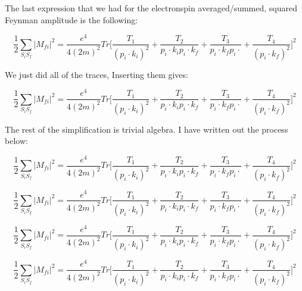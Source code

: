 \documentclass[a4]{article}
\begin{document}
    The last expression that we had for the electronspin averaged/summed, squared Feynman amplitude is the following:

    \begin{equation}
        \frac{1}{2} \sum_{S_i S_f} |M_{fi}|^2 = \frac{e^4}{4 (2m)^2} Tr \Bigg[ \frac{T_1}{(p_i \cdot k_i)^2} + \frac{T_2}{p_i \cdot k_i p_i \cdot k_f} + \frac{T_3}{p_i \cdot k_f p_i \cdot} + \frac{T_4}{(p_i \cdot k_f)^2} \Bigg]^2
    \end{equation}
    
    We just did all of the traces, Inserting them gives:

    \begin{equation}
        \frac{1}{2} \sum_{S_i S_f} |M_{fi}|^2 = \frac{e^4}{4 (2m)^2} Tr \Bigg[ \frac{T_1}{(p_i \cdot k_i)^2} + \frac{T_2}{p_i \cdot k_i p_i \cdot k_f} + \frac{T_3}{p_i \cdot k_f p_i \cdot} + \frac{T_4}{(p_i \cdot k_f)^2} \Bigg]^2
    \end{equation}

    The rest of the simplification is trivial algebra. I have written out the process below:

    \begin{equation}
        \frac{1}{2} \sum_{S_i S_f} |M_{fi}|^2 = \frac{e^4}{4 (2m)^2} Tr \Bigg[ \frac{T_1}{(p_i \cdot k_i)^2} + \frac{T_2}{p_i \cdot k_i p_i \cdot k_f} + \frac{T_3}{p_i \cdot k_f p_i \cdot} + \frac{T_4}{(p_i \cdot k_f)^2} \Bigg]^2
    \end{equation}

    \begin{equation}
        \frac{1}{2} \sum_{S_i S_f} |M_{fi}|^2 = \frac{e^4}{4 (2m)^2} Tr \Bigg[ \frac{T_1}{(p_i \cdot k_i)^2} + \frac{T_2}{p_i \cdot k_i p_i \cdot k_f} + \frac{T_3}{p_i \cdot k_f p_i \cdot} + \frac{T_4}{(p_i \cdot k_f)^2} \Bigg]^2
    \end{equation}

    \begin{equation}
        \frac{1}{2} \sum_{S_i S_f} |M_{fi}|^2 = \frac{e^4}{4 (2m)^2} Tr \Bigg[ \frac{T_1}{(p_i \cdot k_i)^2} + \frac{T_2}{p_i \cdot k_i p_i \cdot k_f} + \frac{T_3}{p_i \cdot k_f p_i \cdot} + \frac{T_4}{(p_i \cdot k_f)^2} \Bigg]^2
    \end{equation}

    \begin{equation}
        \frac{1}{2} \sum_{S_i S_f} |M_{fi}|^2 = \frac{e^4}{4 (2m)^2} Tr \Bigg[ \frac{T_1}{(p_i \cdot k_i)^2} + \frac{T_2}{p_i \cdot k_i p_i \cdot k_f} + \frac{T_3}{p_i \cdot k_f p_i \cdot} + \frac{T_4}{(p_i \cdot k_f)^2} \Bigg]^2
    \end{equation}
\end{document}
